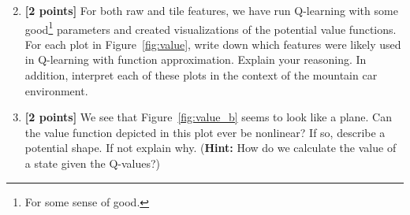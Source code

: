 \begin{enumerate}
\setcounter{enumi}{1}
\item \textbf{[2 points]} For both raw and tile features, we have run Q-learning with some good\footnote{For some sense of good.} parameters and created visualizations of the potential value functions. For each plot in Figure~\ref{fig:value}, write down which features were likely used in Q-learning with function approximation. Explain your reasoning. In addition, interpret each of these plots in the context of the mountain car environment.

\begin{tcolorbox}[fit,height=4cm, width=\linewidth, blank, borderline={1pt}{-2pt},nobeforeafter]
\end{tcolorbox}


\item \textbf{[2 points]} We see that Figure~\ref{fig:value_b} seems to look like a plane. Can the value function depicted in this plot ever be nonlinear? If so, describe a potential shape. If not explain why. (\textbf{Hint:} How do we calculate the value of a state given the Q-values?)


\begin{tcolorbox}[fit,height=4cm, width=\linewidth, blank, borderline={1pt}{-2pt},nobeforeafter]
\end{tcolorbox}

    
\end{enumerate}

